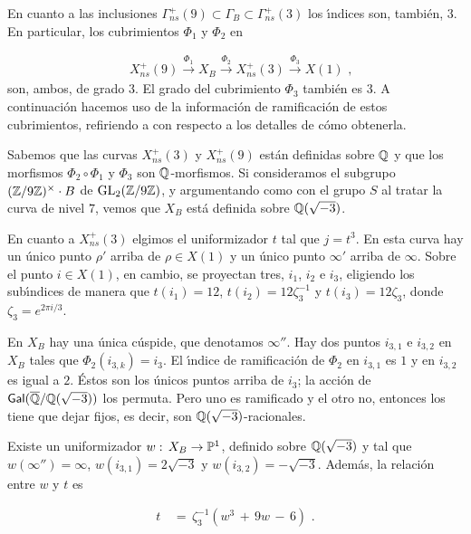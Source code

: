 En cuanto a las inclusiones
$\Gamma_{ns}^{+}(9)\subset\Gamma_{B}\subset\Gamma_{ns}^{+}(3)$ los \'{\i}ndices
son, tambi\'{e}n, $3$. En particular, los cubrimientos $\Phi_{1}$ y
$\Phi_{2}$ en

\begin{align*} 
 & X_{ns}^{+}(9)\xrightarrow{\Phi_{1}}
 X_{B}\xrightarrow{\Phi_{2}} X_{ns}^{+}(3)\xrightarrow{\Phi_{3}}
 X(1)\text{ ,}
\end{align*}
son, ambos, de grado $3$. El grado del cubrimiento $\Phi_{3}$ tambi\'{e}n es $3$.
A continuaci\'{o}n hacemos uso de la informaci\'{o}n de ramificaci\'{o}n de
estos cubrimientos, refiriendo a \cite{baranLevelNine} con respecto a los detalles
de c\'{o}mo obtenerla.

Sabemos que las curvas $X_{ns}^{+}(3)$ y $X_{ns}^{+}(9)$ est\'{a}n definidas
sobre $\mathbb{Q}$ y que los morfismos $\Phi_{2}\circ\Phi_{1}$ y
$\Phi_{3}$ son $\mathbb{Q}$-morfismos. Si consideramos el subgrupo
$(\mathbb{Z}/9\mathbb{Z})^{\times}\cdot B$ de $\mathrm{GL}_{2}(\mathbb{Z}/9\mathbb{Z})$, y argumentando
como con el grupo $S$ al tratar la curva de nivel $7$, vemos que $X_{B}$ est\'{a}
definida sobre $\mathbb{Q}(\sqrt{-3})$.

En cuanto a $X_{ns}^{+}(3)$ elgimos el uniformizador $t$ tal que $j=t^{3}$.
En esta curva hay un \'{u}nico punto $\rho'$ arriba de $\rho\in X(1)$ y
un \'{u}nico punto $\infty'$ arriba de $\infty$. Sobre el punto $i\in X(1)$, en
cambio, se proyectan tres, $i_{1}$, $i_{2}$ e $i_{3}$, eligiendo los
sub\'{\i}ndices de manera que $t(i_{1})=12$, $t(i_{2})=12\zeta_{3}^{-1}$
y $t(i_{3})=12\zeta_{3}$, donde $\zeta_{3}=e^{2\pi i/3}$.

En $X_{B}$ hay una \'{u}nica c\'{u}spide, que denotamos $\infty''$.
Hay dos puntos $i_{3,1}$ e $i_{3,2}$ en $X_{B}$ tales que
$\Phi_{2}(i_{3,k})=i_{3}$. El \'{\i}ndice de ramificaci\'{o}n de $\Phi_{2}$
en $i_{3,1}$ es $1$ y en $i_{3,2}$ es igual a $2$. \'{E}stos son los \'{u}nicos
puntos arriba de $i_{3}$; la acci\'{o}n
de $\mathsf{Gal}(\overline{\mathbb{Q}}/\mathbb{Q}(\sqrt{-3}))$ los permuta. Pero
uno es ramificado y el otro no, entonces los tiene que dejar fijos, es decir,
son $\mathbb{Q}(\sqrt{-3})$-racionales.

\begin{propoBaranNineXB}\label{thm:propoBaranNineXB}
 Existe un uniformizador $w:\,X_{B}\rightarrow\mathbb{P}^{1}$, definido
 sobre $\mathbb{Q}(\sqrt{-3})$ y tal que $w(\infty'')=\infty$, $w(i_{3,1})=2\sqrt{-3}$
 y $w(i_{3,2})=-\sqrt{-3}$. Adem\'{a}s, la relaci\'{o}n entre $w$ y $t$ es

 \begin{align*}
  t & \,=\,\zeta_{3}^{-1}(w^{3}\,+\,9w\,-\,6)\text{ .}
 \end{align*}
\end{propoBaranNineXB}

